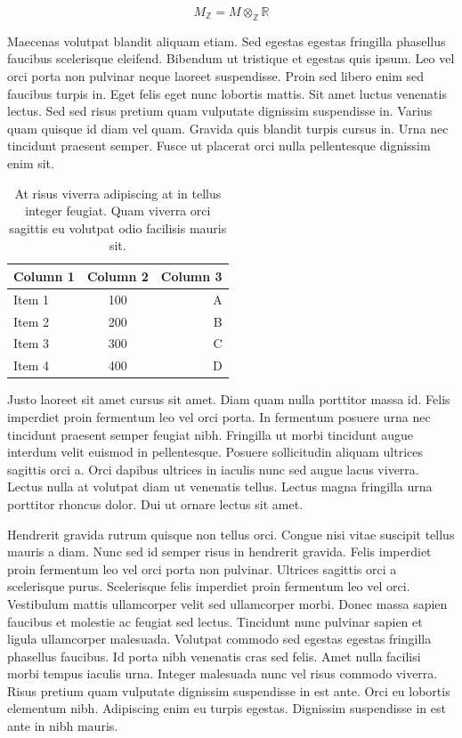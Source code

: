 \documentclass[10pt, a4paper]{article}
\numberwithin{equation}{section}
\begin{document}
\begin{equation}
  M_{\mathbb{Z}} = M \otimes_{\mathbb{Z}} \mathbb{R}
\end{equation}

Maecenas volutpat blandit aliquam etiam. Sed egestas egestas fringilla phasellus faucibus scelerisque eleifend. Bibendum ut tristique et egestas quis ipsum. Leo vel orci porta non pulvinar neque laoreet suspendisse. Proin sed libero enim sed faucibus turpis in. Eget felis eget nunc lobortis mattis. Sit amet luctus venenatis lectus. Sed sed risus pretium quam vulputate dignissim suspendisse in. Varius quam quisque id diam vel quam. Gravida quis blandit turpis cursus in. Urna nec tincidunt praesent semper. Fusce ut placerat orci nulla pellentesque dignissim enim sit.

\begin{table}[ht]
  \centering
  \caption{At risus viverra adipiscing at in tellus integer feugiat. Quam viverra orci sagittis eu volutpat odio facilisis mauris sit.}
  \label{tab:sampledata}
  \begin{tabular}{@{}lcr@{}} %
  \toprule
  Column 1 & Column 2 & Column 3 \\
  \midrule
  Item 1 & 100 & A \\
  Item 2 & 200 & B \\
  Item 3 & 300 & C \\
  Item 4 & 400 & D \\
  \bottomrule
  \end{tabular}
\end{table}

Justo laoreet sit amet cursus sit amet. Diam quam nulla porttitor massa id. Felis imperdiet proin fermentum leo vel orci porta. In fermentum posuere urna nec tincidunt praesent semper feugiat nibh. Fringilla ut morbi tincidunt augue interdum velit euismod in pellentesque. Posuere sollicitudin aliquam ultrices sagittis orci a. Orci dapibus ultrices in iaculis nunc sed augue lacus viverra. Lectus nulla at volutpat diam ut venenatis tellus. Lectus magna fringilla urna porttitor rhoncus dolor. Dui ut ornare lectus sit amet.

Hendrerit gravida rutrum quisque non tellus orci. Congue nisi vitae suscipit tellus mauris a diam. Nunc sed id semper risus in hendrerit gravida. Felis imperdiet proin fermentum leo vel orci porta non pulvinar. Ultrices sagittis orci a scelerisque purus. Scelerisque felis imperdiet proin fermentum leo vel orci. Vestibulum mattis ullamcorper velit sed ullamcorper morbi. Donec massa sapien faucibus et molestie ac feugiat sed lectus. Tincidunt nunc pulvinar sapien et ligula ullamcorper malesuada. Volutpat commodo sed egestas egestas fringilla phasellus faucibus. Id porta nibh venenatis cras sed felis. Amet nulla facilisi morbi tempus iaculis urna. Integer malesuada nunc vel risus commodo viverra. Risus pretium quam vulputate dignissim suspendisse in est ante. Orci eu lobortis elementum nibh. Adipiscing enim eu turpis egestas. Dignissim suspendisse in est ante in nibh mauris.
\end{document}
